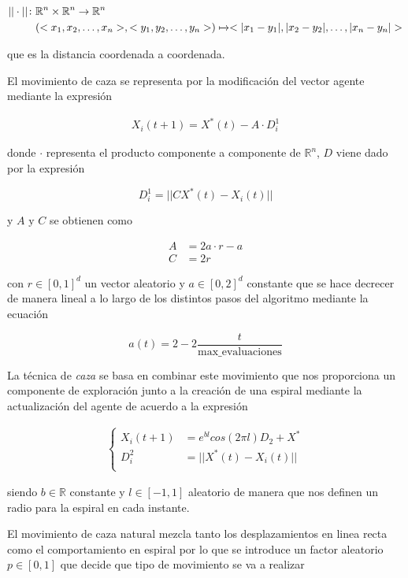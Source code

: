 \documentclass[11pt]{article}
\begin{document}
\begin{align*}
    ||\cdot||\colon & \mathbb{R}^n\times\mathbb{R}^n \to \mathbb{R}^n\\
    & (<x_1, x_2, \dots, x_n>, <y_1, y_2, \dots, y_n>) \xmapsto{}<|x_1 - y_1|, |x_2-y_2|, \dots, |x_n-y_n|>
\end{align*}

que es la distancia coordenada a coordenada.

El movimiento de caza se representa por la modificación del vector agente
mediante la expresión

\begin{align}
    X_i(t+1) = X^*(t) - A\cdot D_i^1  \label{eq:1}
\end{align}

donde $\cdot$ representa el producto componente a componente de $\mathbb{R}^n$, $D$ viene dado por
la expresión

\[
    D^1_i = ||CX^*(t)-X_i(t)||    
\]

y $A \text{ y } C$ se obtienen como 

\begin{align*}
    A &= 2a\cdot r - a \\
    C &= 2r
\end{align*}

con $r \in [0,1]^d$ un vector aleatorio y $a\in [0,2]^d$ constante que se hace
decrecer de manera lineal a lo largo de los distintos pasos del algoritmo
mediante la ecuación

\[
  a(t) = 2-2\frac{t}{\text{max\_evaluaciones}}  
\]

La técnica de \textit{caza} se basa en combinar este movimiento que nos
proporciona un componente de exploración junto a la creación de una espiral 
mediante la actualización del agente de acuerdo a la expresión 

\begin{align}
\begin{cases}
    X_i(t+1) &= e^{bl}cos(2\pi l)D_2 + X^* \\
    D^2_i &= ||X^*(t)-X_i(t)||\\
\end{cases}\label{eq:2}
\end{align}

siendo $b \in \mathbb{R}$ constante y $l \in [-1,1]$ aleatorio de manera que
nos definen un radio para la espiral en cada instante.

El movimiento de caza natural mezcla tanto los desplazamientos en linea recta
como el comportamiento en espiral por lo que se introduce un factor aleatorio
$p \in [0,1]$ que decide que tipo de movimiento se va a realizar
\end{document}
